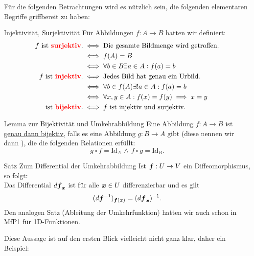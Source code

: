 Für die folgenden Betrachtungen wird es nützlich sein, die folgenden elementaren Begriffe griffbereit zu haben:
\begin{Wiederholung}
{Injektivität{,} Surjektivität}\label{wdh:09InjekSurjek}
Für Abbildungen $f:A\to B$ hatten wir definiert:
\begin{align*}
        f\text{ ist \textcolor{red}{\textbf{surjektiv}}.}&\iff \text{Die gesamte Bildmenge wird getroffen.}\\
        &\iff f(A)=B\\
        &\iff \forall b\in B\exists a\in A: f(a)=b\\
        f\text{ ist \textcolor{red}{\textbf{injektiv}}.}&\iff\text{Jedes Bild hat genau ein Urbild.}\\
        &\iff\forall b\in f(A)\exists!a\in A: f(a)=b\\
        &\iff \forall x,y\in A: f(x)=f(y)\implies x=y\\
        \text{ ist \textcolor{red}{\textbf{bijektiv}}.}&\iff f\text{ ist injektiv und surjektiv.}
\end{align*}
\end{Wiederholung}
\begin{Wiederholung}
{Lemma zur Bijektivität und Umkehrabbildung}\label{wdh:09BijektivitatUmkehrabbildung}
Eine Abbildung $f:A\rightarrow B$ ist \underline{genau dann bijektiv}, falls es eine Abbildung $g:B\to A$ gibt (diese nennen wir dann ), die die folgenden Relationen erfüllt:
\begin{equation}
    g\circ f=\text{Id}_A\,\wedge\, f\circ g=\text{Id}_B.\label{eq:Umkehrabbildung}
\end{equation}
\end{Wiederholung}
\begin{Satz}{Satz}
{Zum Differential der Umkehrabbildung}
Ist ${{\text{\boldmath${f}$}}}:U\to V$ ein Diffeomorphismus, so folgt:\\
Das Differential $d{{\text{\boldmath${f}$}}}_{{\text{\boldmath${x}$}}}$ ist für alle ${{\text{\boldmath${x}$}}}\in U$ differenzierbar und es gilt
\begin{equation}
    (d{{\text{\boldmath${f}$}}}^{-1})_{{{\text{\boldmath${f}$}}}({{\text{\boldmath${x}$}}})}=(d{{\text{\boldmath${f}$}}}_{{\text{\boldmath${x}$}}})^{-1}.
\end{equation}
Den analogen Satz (Ableitung der Umkehrfunktion) hatten wir auch schon in MfP1 für 1D-Funktionen.
\end{Satz}
Diese Aussage ist auf den ersten Blick vielleicht nicht ganz klar, daher ein Beispiel:
